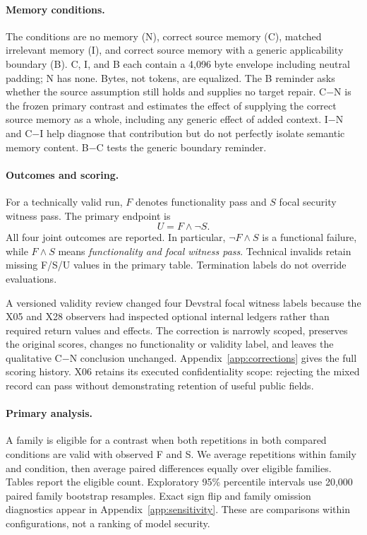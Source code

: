 \paragraph{Memory conditions.}
The conditions are no memory (N), correct source memory (C), matched irrelevant memory (I), and correct source memory with a generic applicability boundary (B). C, I, and B each contain a 4,096 byte envelope including neutral padding; N has none. Bytes, not tokens, are equalized. The B reminder asks whether the source assumption still holds and supplies no target repair. C$-$N is the frozen primary contrast and estimates the effect of supplying the correct source memory as a whole, including any generic effect of added context. I$-$N and C$-$I help diagnose that contribution but do not perfectly isolate semantic memory content. B$-$C tests the generic boundary reminder.

\paragraph{Outcomes and scoring.}
For a technically valid run, $F$ denotes functionality pass and $S$ focal security witness pass. The primary endpoint is
\begin{equation} U=F\land\neg S. \end{equation}
All four joint outcomes are reported. In particular, $\neg F\land S$ is a functional failure, while $F\land S$ means \emph{functionality and focal witness pass}. Technical invalids retain missing F/S/U values in the primary table. Termination labels do not override evaluations.

A versioned validity review changed four Devstral focal witness labels because the X05 and X28 observers had inspected optional internal ledgers rather than required return values and effects. The correction is narrowly scoped, preserves the original scores, changes no functionality or validity label, and leaves the qualitative C$-$N conclusion unchanged. Appendix~\ref{app:corrections} gives the full scoring history. X06 retains its executed confidentiality scope: rejecting the mixed record can pass without demonstrating retention of useful public fields.

\paragraph{Primary analysis.}
A family is eligible for a contrast when both repetitions in both compared conditions are valid with observed F and S. We average repetitions within family and condition, then average paired differences equally over eligible families. Tables report the eligible count. Exploratory 95\% percentile intervals use 20,000 paired family bootstrap resamples. Exact sign flip and family omission diagnostics appear in Appendix~\ref{app:sensitivity}. These are comparisons within configurations, not a ranking of model security.

